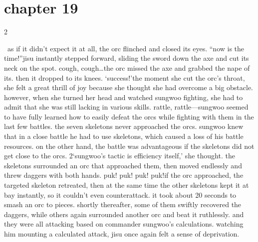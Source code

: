 \section{chapter 19}

                            2




 as if it didn’t expect it at all, the orc flinched and closed its eyes.
“now is the time!”jisu instantly stepped forward, sliding the sword down the axe and cut its neck on the spot.
cough, cough…the orc missed the axe and grabbed the nape of its.
 then it dropped to its knees.
‘success!’the moment she cut the orc’s throat, she felt a great thrill of joy because she thought she had overcome a big obstacle.
however, when she turned her head and watched sungwoo fighting, she had to admit that she was still lacking in various skills.
rattle, rattle—sungwoo seemed to have fully learned how to easily defeat the orcs while fighting with them in the last few battles.
the seven skeletons never approached the orcs.
 sungwoo knew that in a close battle he had to use skeletons, which caused a loss of his battle resources.
 on the other hand, the battle was advantageous if the skeletons did not get close to the orcs.
2‘sungwoo’s tactic is efficiency itself,’ she thought.
the skeletons surrounded an orc that approached them, then moved endlessly and threw daggers with both hands.
puk! puk! puk! puk!if the orc approached, the targeted skeleton retreated, then at the same time the other skeletons kept it at bay instantly, so it couldn’t even counterattack.
it took about 20 seconds to smash an orc to pieces.
shortly thereafter, some of them swiftly recovered the daggers, while others again surrounded another orc and beat it ruthlessly.
and they were all attacking based on commander sungwoo’s calculations.
 watching him mounting a calculated attack, jisu once again felt a sense of deprivation.

